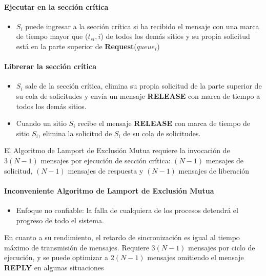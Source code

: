 {\paragraph{Ejecutar en la secci\'on cr\'itica} 
	\begin{itemize}
		\item $S_{i}$ puede ingresar a la sección crítica si ha
		recibido el mensaje con una marca de tiempo mayor que
		($t_{si}, i$) de todos los demás sitios y su propia solicitud está  en la parte superior de \textbf{Request}($queue_{i}$)
	\end{itemize}
	
\paragraph{Librerar la secci\'on cr\'itica}
	\begin{itemize}
		\item $S_{i}$ sale de la sección crítica, elimina su propia
		solicitud de la parte superior de su cola de solicitudes y
		envía un mensaje \textbf{RELEASE} con marca de tiempo a todos 	los demás sitios.
		\item 	Cuando un sitio  $S_{i}$ recibe el mensaje \textbf{RELEASE} con marca de tiempo de sitio $S_{i}$, elimina la solicitud de $S_{i}$ de su cola de solicitudes.
	\end{itemize}
 

 El Algoritmo de Lamport de Exclusi\'on Mutua requiere la invocación de $3 (N - 1)$ mensajes por ejecución de sección crítica: 
	$( N- 1)$ mensajes de solicitud, 
	$( N- 1)$  mensajes de respuesta  y
	$( N- 1)$  mensajes de liberación
	
\paragraph{Inconveniente Algoritmo de Lamport de Exclusi\'on Mutua}
	\begin{itemize}
		\item Enfoque no confiable: la falla de cualquiera de
		los procesos detendrá el progreso de todo el
		sistema. 
		
	\end{itemize}
En cuanto a su rendimiento,  el retardo de sincronización es igual al tiempo máximo de transmisión de mensajes.  Requiere $3(N - 1)$ mensajes por ciclo de ejecución, y se  puede optimizar a $2(N - 1)$	mensajes omitiendo el mensaje \textbf{REPLY} en 	algunas situaciones
	 
}
